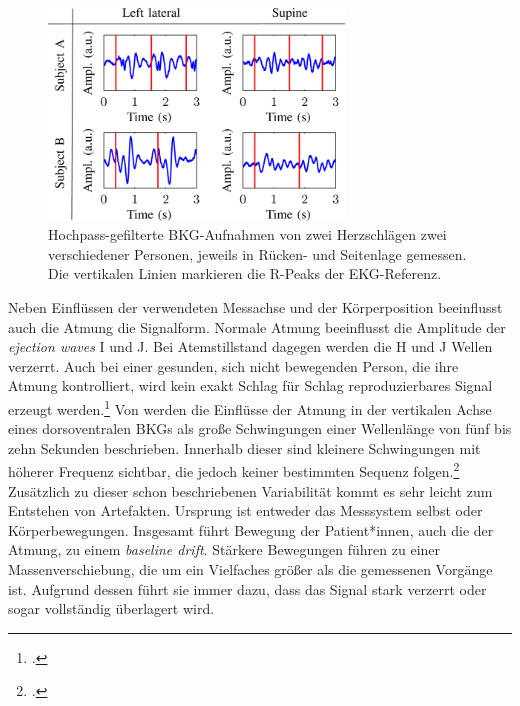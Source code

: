 	\begin{figure}[H]
		\centering
		\includegraphics[width=0.7\textwidth]{pic/bcg2postures.png}
		\caption[\ac{BKG}-Aufnahmen in Rücken- und Seitenlage]{Hochpass-gefilterte \ac{BKG}-Aufnahmen von zwei Herzschlägen zwei verschiedener Personen, jeweils in Rücken- und Seitenlage gemessen. Die vertikalen Linien markieren die R-Peaks der EKG-Referenz.\protect\footnotemark}
		\label{fig:bcg2postures}
	\end{figure}
	
	Neben Einflüssen der verwendeten Messachse und der Körperposition beeinflusst auch die Atmung die Signalform. Normale Atmung beeinflusst die Amplitude der \textit{ejection waves} I und J. Bei Atemstillstand dagegen werden die H und J Wellen verzerrt. Auch bei einer gesunden, sich nicht bewegenden Person, die ihre Atmung kontrolliert, wird kein exakt Schlag für Schlag reproduzierbares Signal erzeugt werden.\footcite{Pinheiro2010} Von \citeauthor{Zink2017} werden die Einflüsse der Atmung in der vertikalen Achse eines dorsoventralen \ac{BKG}s als große Schwingungen einer Wellenlänge von fünf bis zehn Sekunden beschrieben. Innerhalb dieser sind kleinere Schwingungen mit höherer Frequenz sichtbar, die jedoch keiner bestimmten Sequenz folgen.\footcite{Zink2017} Zusätzlich zu dieser schon beschriebenen Variabilität kommt es sehr leicht zum Entstehen von Artefakten. Ursprung ist entweder das Messsystem selbst oder Körperbewegungen. Insgesamt führt Bewegung der Patient*innen, auch die der Atmung, zu einem \textit{baseline drift}. Stärkere Bewegungen führen zu einer Massenverschiebung, die um ein Vielfaches größer als die gemessenen Vorgänge ist. Aufgrund dessen führt sie immer dazu, dass das Signal stark verzerrt oder sogar vollständig überlagert wird.

